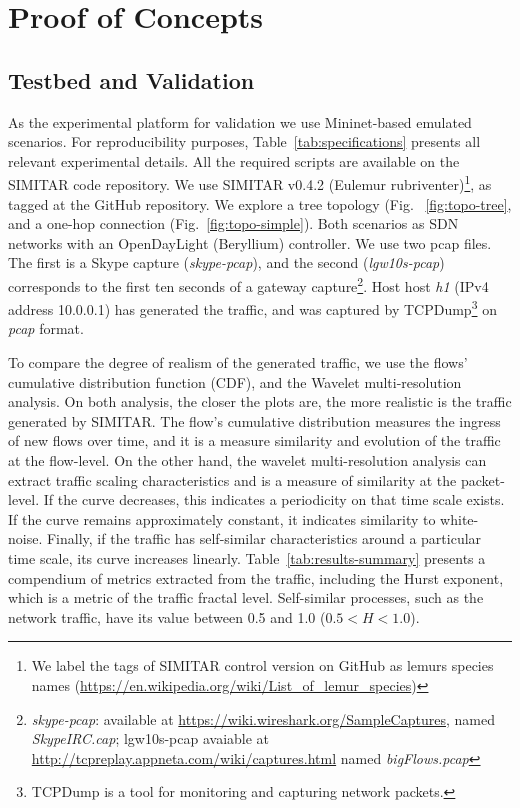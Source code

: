 \chapter{Proof of Concepts}\label{ch:validation}


\section{Testbed and Validation}


As the experimental platform for validation we use Mininet-based emulated scenarios.  For reproducibility purposes, Table~\ref{tab:specifications} presents all relevant experimental details. All the required scripts are available on the SIMITAR code repository\cite{projeto-github}. We use SIMITAR v0.4.2 (Eulemur rubriventer)\footnote{ We label the tags of SIMITAR control version on GitHub as lemurs species names (\href{https://en.wikipedia.org/wiki/List_of_lemur_species}{https://en.wikipedia.org/wiki/List\_of\_lemur\_species})}, as tagged at the GitHub repository. We explore a tree topology (Fig. ~\ref{fig:topo-tree}, and a one-hop connection (Fig.~\ref{fig:topo-simple}). Both scenarios as  SDN networks with an OpenDayLight (Beryllium) controller. We use two pcap files. The first is a Skype capture (\textit{skype-pcap}), and the second (\textit{lgw10s-pcap}) corresponds to the first ten seconds of a gateway capture\footnote{\textit{skype-pcap}: available at \url{https://wiki.wireshark.org/SampleCaptures}, named \textit{SkypeIRC.cap}; lgw10s-pcap avaiable at \url{http://tcpreplay.appneta.com/wiki/captures.html} named \textit{bigFlows.pcap}}. Host host \textit{h1} (IPv4 address 10.0.0.1) has generated the traffic, and was captured by TCPDump\footnote{TCPDump is a tool for monitoring and capturing network packets\cite{web-tcpdump}.} on \textit{pcap} format. 

To compare the degree of realism of the generated traffic, we use the flows' cumulative distribution function (CDF)\cite{harpoon-validation}, and the Wavelet multi-resolution analysis\cite{swing-paper}. On both analysis, the closer the plots are, the more realistic is the traffic generated by SIMITAR. The flow’s cumulative distribution measures the ingress of new flows over time, and it is a measure similarity and evolution of the traffic at the flow-level. On the other hand, the wavelet multi-resolution analysis can extract traffic scaling characteristics and is a measure of similarity at the packet-level. If the curve decreases, this indicates a periodicity on that time scale exists. If the curve remains approximately constant, it indicates similarity to white-noise. Finally, if the traffic has self-similar characteristics around a particular time scale, its curve increases linearly. Table~\ref{tab:results-summary} presents a compendium of metrics extracted from the traffic, including the Hurst exponent, which is a metric of the traffic fractal level. Self-similar  processes, such as the network traffic, have its value between 0.5  and 1.0 ($0.5 < H < 1.0 $)\cite{selfsimilar-ethernet}.


